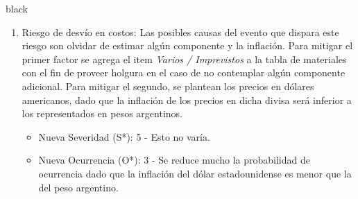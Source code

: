 \documentclass[
11pt, %
]{charter}
\begin{document}
\begin{consigna}{black}
\begin{enumerate}
	\item Riesgo de desvío en costos: Las posibles causas del evento que dispara este riesgo son olvidar de estimar algún componente y la inflación. Para mitigar el primer factor se agrega el item \textit{Varios / Imprevistos} a la tabla de materiales con el fin de proveer holgura en el caso de no contemplar algún componente adicional. Para mitigar el segundo, se plantean los precios en dólares americanos, dado que la inflación de los precios en dicha divisa será inferior a los representados en pesos argentinos.
	\begin{itemize}
		\item Nueva Severidad (S*): 5 - Esto no varía.
		\item Nueva Ocurrencia (O*): 3 - Se reduce mucho la probabilidad de ocurrencia dado que la inflación del dólar estadounidense es menor que la del peso argentino.
	\end{itemize}
\end{enumerate}
\end{consigna}
\end{document}
